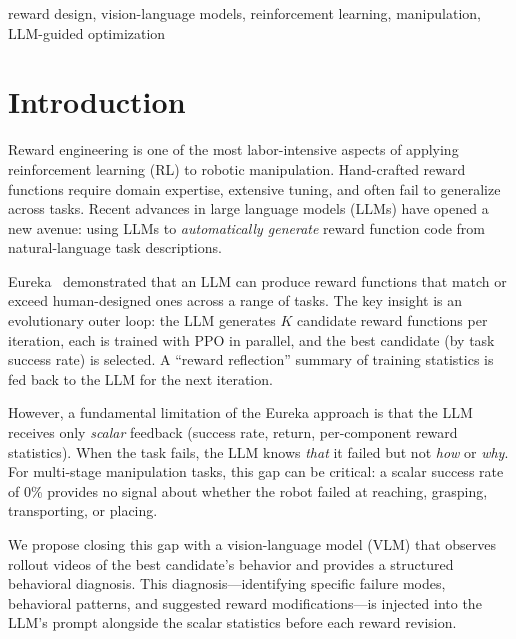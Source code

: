 \documentclass[conference]{IEEEtran}
\begin{document}
\begin{IEEEkeywords}
reward design, vision-language models, reinforcement learning, manipulation,
LLM-guided optimization
\end{IEEEkeywords}

\section{Introduction}

Reward engineering is one of the most labor-intensive aspects of applying
reinforcement learning (RL) to robotic manipulation. Hand-crafted reward
functions require domain expertise, extensive tuning, and often fail to
generalize across tasks. Recent advances in large language models (LLMs) have
opened a new avenue: using LLMs to \emph{automatically generate} reward
function code from natural-language task descriptions.

Eureka~\cite{eureka} demonstrated that an LLM can produce reward functions that
match or exceed human-designed ones across a range of tasks. The key insight is
an evolutionary outer loop: the LLM generates $K$ candidate reward functions per
iteration, each is trained with PPO in parallel, and the best candidate (by task
success rate) is selected. A ``reward reflection'' summary of training
statistics is fed back to the LLM for the next iteration.

However, a fundamental limitation of the Eureka approach is that the LLM
receives only \emph{scalar} feedback (success rate, return, per-component reward
statistics). When the task fails, the LLM knows \emph{that} it failed but not
\emph{how} or \emph{why}. For multi-stage manipulation tasks, this gap can be
critical: a scalar success rate of 0\% provides no signal about whether the
robot failed at reaching, grasping, transporting, or placing.

We propose closing this gap with a vision-language model (VLM) that observes
rollout videos of the best candidate's behavior and provides a structured
behavioral diagnosis. This diagnosis---identifying specific failure modes,
behavioral patterns, and suggested reward modifications---is injected into the
LLM's prompt alongside the scalar statistics before each reward revision.
\end{document}
